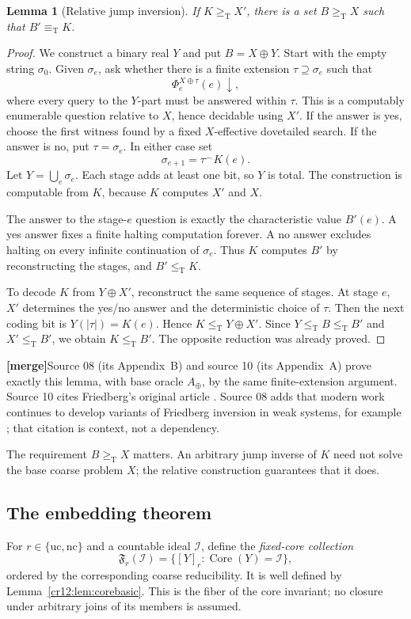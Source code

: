\documentclass[11pt,letterpaper]{article}
\theoremstyle{plain}
\newtheorem{lemma}[theorem]{Lemma}
\theoremstyle{definition}
\theoremstyle{remark}
\numberwithin{equation}{section}
\newcommand{\leT}{\leq_{\mathrm T}}
\newcommand{\geT}{\geq_{\mathrm T}}
\newcommand{\eqT}{\equiv_{\mathrm T}}
\newcommand{\Core}{\operatorname{Core}}
\newcommand{\cat}{\mathbin{{}^\frown}}
\newcommand{\I}{\mathcal I}
\newcommand{\fiber}{\mathfrak F}
\newcommand{\mergenote}[1]{\par\smallskip\noindent
 {\small\textsf{\textbf{[merge]}}\enspace #1}\par\smallskip}
\newcommand{\Aplus}{A_{\oplus}}          %
\begin{document}
\begin{lemma}[Relative jump inversion]\label{cr12:lem:inversion}
If $K\geT X'$, there is a set $B\geT X$ such that $B'\eqT K$.
\end{lemma}
\begin{proof}
We construct a binary real $Y$ and put $B=X\oplus Y$. Start with the empty
string $\sigma_0$. Given $\sigma_e$, ask whether there is a finite extension
$\tau\supseteq\sigma_e$ such that
\[
 \Phi_e^{X\oplus\tau}(e)\downarrow,
\]
where every query to the $Y$-part must be answered within $\tau$.
This is a computably enumerable question relative to $X$, hence decidable
using $X'$. If the answer is yes, choose the first witness found by a fixed
$X$-effective dovetailed search. If the answer is no, put $\tau=\sigma_e$.
In either case set
\[
 \sigma_{e+1}=\tau\cat K(e).
\]
Let $Y=\bigcup_e\sigma_e$. Each stage adds at least one bit, so $Y$ is total.
The construction is computable from $K$, because $K$ computes $X'$ and $X$.

The answer to the stage-$e$ question is exactly the characteristic value
$B'(e)$. A yes answer fixes a finite halting computation forever. A no answer
excludes halting on every infinite continuation of $\sigma_e$. Thus $K$
computes $B'$ by reconstructing the stages, and $B'\leT K$.

To decode $K$ from $Y\oplus X'$, reconstruct the same sequence of stages.
At stage $e$, $X'$ determines the yes/no answer and the deterministic choice
of $\tau$. Then the next coding bit is $Y(|\tau|)=K(e)$. Hence
$K\leT Y\oplus X'$. Since $Y\leT B\leT B'$ and $X'\leT B'$,
we obtain $K\leT B'$. The opposite reduction was already proved.
\end{proof}
\mergenote{Source 08 (its Appendix~B) and source 10 (its Appendix~A) prove exactly this
lemma, with base oracle $\Aplus$, by the same finite-extension argument. Source 10
cites Friedberg's original article \cite{Friedberg}. Source 08 adds that modern work
continues to develop variants of Friedberg inversion in weak systems, for example
\cite{Belanger}; that citation is context, not a dependency.}

The requirement $B\geT X$ matters. An arbitrary jump inverse of $K$ need not
solve the base coarse problem $X$; the relative construction guarantees that it
does.

\subsection{The embedding theorem}
For $r\in\{\mathrm{uc},\mathrm{nc}\}$ and a countable ideal $\I$, define the
\emph{fixed-core collection}
\[
 \fiber_r(\I)=\{[Y]_r:\Core(Y)=\I\},
\]
ordered by the corresponding coarse reducibility. It is well defined by
Lemma~\ref{cr12:lem:corebasic}. This is the fiber of the core invariant; no closure
under arbitrary joins of its members is assumed.
\end{document}

